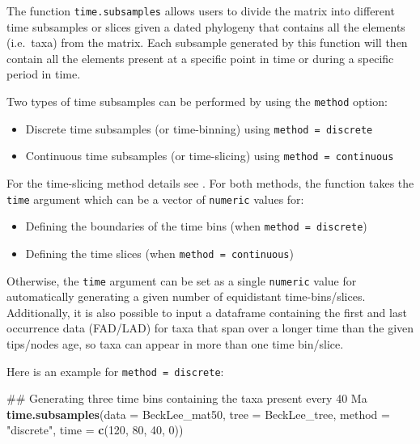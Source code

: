 \documentclass[]{book}
\newenvironment{Shaded}{\begin{snugshade}}{\end{snugshade}}
\newcommand{\KeywordTok}[1]{\textcolor[rgb]{0.13,0.29,0.53}{\textbf{#1}}}
\newcommand{\DataTypeTok}[1]{\textcolor[rgb]{0.13,0.29,0.53}{#1}}
\newcommand{\DecValTok}[1]{\textcolor[rgb]{0.00,0.00,0.81}{#1}}
\newcommand{\StringTok}[1]{\textcolor[rgb]{0.31,0.60,0.02}{#1}}
\newcommand{\NormalTok}[1]{#1}
\providecommand{\tightlist}{%
  \setlength{\itemsep}{0pt}\setlength{\parskip}{0pt}}
\theoremstyle{definition}
\theoremstyle{definition}
\theoremstyle{remark}
\begin{document}
The function \texttt{time.subsamples} allows users to divide the matrix
into different time subsamples or slices given a dated phylogeny that
contains all the elements (i.e.~taxa) from the matrix. Each subsample
generated by this function will then contain all the elements present at
a specific point in time or during a specific period in time.

Two types of time subsamples can be performed by using the
\texttt{method} option:

\begin{itemize}
\tightlist
\item
  Discrete time subsamples (or time-binning) using
  \texttt{method\ =\ discrete}
\item
  Continuous time subsamples (or time-slicing) using
  \texttt{method\ =\ continuous}
\end{itemize}

For the time-slicing method details see \citet{GuillermeSTD}. For both
methods, the function takes the \texttt{time} argument which can be a
vector of \texttt{numeric} values for:

\begin{itemize}
\tightlist
\item
  Defining the boundaries of the time bins (when
  \texttt{method\ =\ discrete})
\item
  Defining the time slices (when \texttt{method\ =\ continuous})
\end{itemize}

Otherwise, the \texttt{time} argument can be set as a single
\texttt{numeric} value for automatically generating a given number of
equidistant time-bins/slices. Additionally, it is also possible to input
a dataframe containing the first and last occurrence data (FAD/LAD) for
taxa that span over a longer time than the given tips/nodes age, so taxa
can appear in more than one time bin/slice.

Here is an example for \texttt{method\ =\ discrete}:

\begin{Shaded}
\begin{Highlighting}[]
\NormalTok{## Generating three time bins containing the taxa present every 40 Ma}
\KeywordTok{time.subsamples}\NormalTok{(}\DataTypeTok{data =}\NormalTok{ BeckLee_mat50, }\DataTypeTok{tree =}\NormalTok{ BeckLee_tree, }\DataTypeTok{method =} \StringTok{"discrete"}\NormalTok{,}
                \DataTypeTok{time =} \KeywordTok{c}\NormalTok{(}\DecValTok{120}\NormalTok{, }\DecValTok{80}\NormalTok{, }\DecValTok{40}\NormalTok{, }\DecValTok{0}\NormalTok{))}
\end{Highlighting}
\end{Shaded}
\end{document}
